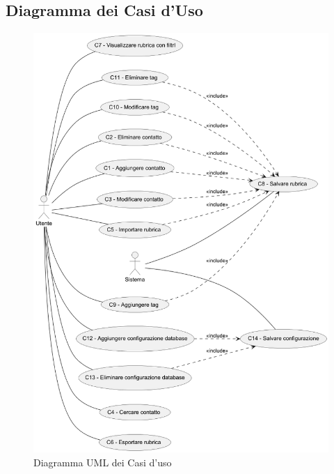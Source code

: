 \subsection{Diagramma dei Casi d'Uso}
\begin{figure}[h]
	\centering
	\includegraphics[width=.77\linewidth]{images/DiagrammaCasiD.png}
	\caption{Diagramma UML dei Casi d'uso}
	\label{diagramma_casi_duso1}	
\end{figure}

\newpage
